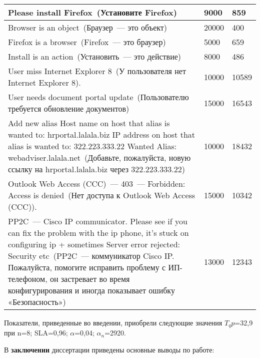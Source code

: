 \begin{longtable}{|p{12cm}|p{2cm}|p{2cm}|}
  \hline
  Please install Firefox~(Установите Firefox)   & 9000 & 859 \\
  \hline
  Browser is an object~(Браузер~--- это объект)   & 20000 & 400 \\
  \hline
  Firefox is a browser~(Firefox~--- это браузер)   & 5000 & 659  \\
  \hline
  Install is an action~(Установить~--- это действие)   & 8000 & 486 \\
  \hline
  User miss Internet Explorer 8~(У пользователя нет Internet Explorer 8).     & 10000 & 10589 \\
  \hline
  User needs document portal update~(Пользователю требуется обновление документов)    & 15000 & 16543 \\
  \hline
  Add new alias Host name on host that alias is wanted to: hrportal.lalala.biz IP address on host that alias is wanted to: 322.223.333.22 Wanted Alias:    webadviser.lalala.net~(Добавьте, пожалуйста, новую ссылку на hrportal.lalala.biz через 322.223.333.22)    & 10000 & 18432  \\ 
  \hline
  Outlook Web Access (CCC)~--- 403~--- Forbidden: Access is denied~(Нет доступа к Outlook Web Access (CCC)). & 15000 & 10342\\ 
  \hline
  PP2C~--- Cisco IP communicator. Please see if you can fix the problem with the ip phone, it's stuck on configuring ip + sometimes Server error rejected: Security etc~(PP2C~--- коммуникатор Cisco IP. Пожалуйста, помогите исправить проблему с ИП-телефоном, он застревает во время конфигурирования и иногда показывает ошибку «Безопасность»)  & 13000 & 12343 \\ 
   
  \end{longtable}
  
  Показатели, приведенные во введении, приобрели следующие значения $T_qp$=32,9 при n=8; SLA=0,96; $\alpha$=0,04;  $\alpha_n$=2920. 

В \textbf{заключении} диссертации приведены основные выводы по работе:


 

\renewcommand{\refname}{\large Публикации автора по теме диссертации}

\insertbiblioall

